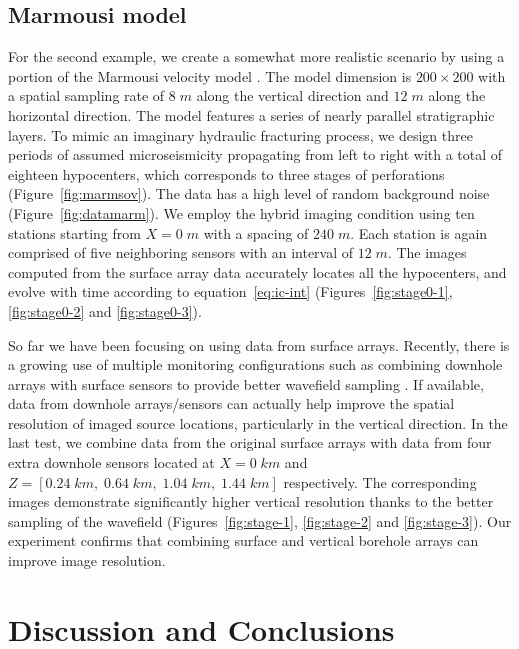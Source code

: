 \subsection{Marmousi model}

For the second example, we create a somewhat more realistic scenario by using a portion of the Marmousi velocity model \cite[]{marmousi}. The model dimension is $200 \times 200$ with a spatial sampling rate of $8\;m$ along the vertical direction and $12\;m$ along the horizontal direction. The model features a series of nearly parallel stratigraphic layers. To mimic an imaginary hydraulic fracturing process, we design three periods of assumed microseismicity propagating from left to right with a total of eighteen hypocenters, which corresponds to three stages of perforations (Figure~\ref{fig:marmsov}). The data has a high level of random background noise (Figure~\ref{fig:datamarm}). We employ the hybrid imaging condition using ten stations starting from $X=0\;m$ with a spacing of $240\;m$. Each station is again comprised of five neighboring sensors with an interval of $12\;m$. The images computed from the surface array data accurately locates all the hypocenters, and evolve with time according to equation~\ref{eq:ic-int} (Figures~\ref{fig:stage0-1}, \ref{fig:stage0-2} and \ref{fig:stage0-3}).

So far we have been focusing on using data from surface arrays. Recently, there is a growing use of multiple monitoring configurations such as combining downhole arrays with surface sensors to provide better wavefield sampling \cite[]{maxwellbook}. If available, data from downhole arrays/sensors can actually help improve the spatial resolution of imaged source locations, particularly in the vertical direction. In the last test, we combine data from the original surface arrays with data from four extra downhole sensors located at $X=0\;km$ and $Z=[0.24\;km,\;0.64\;km,\;1.04\;km,\;1.44\;km]$ respectively. The corresponding images demonstrate significantly higher vertical resolution thanks to the better sampling of the wavefield (Figures~\ref{fig:stage-1}, \ref{fig:stage-2} and \ref{fig:stage-3}). Our experiment confirms that combining surface and vertical borehole arrays can improve image resolution.

\section{Discussion and Conclusions}

